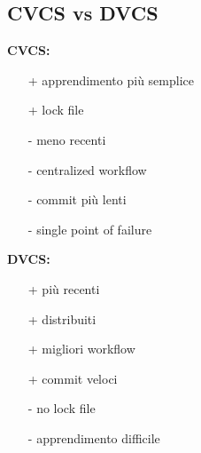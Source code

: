 \subsection{CVCS vs DVCS}
\begin{multicols}{2}
    \raggedright
    \textbf{CVCS:}
    \begin{itemize}
        \item[+] apprendimento più semplice
        \item[+] lock file
        \item[-] meno recenti
        \item[-] centralized workflow
        \item[-] commit più lenti
        \item[-] single point of failure
    \end{itemize}
    \columnbreak
    \textbf{DVCS:}
    \begin{itemize}
        \item[+] più recenti
        \item[+] distribuiti
        \item[+] migliori workflow
        \item[+] commit veloci
        \item[-] no lock file
        \item[-] apprendimento difficile
    \end{itemize}
\end{multicols}

\newpage